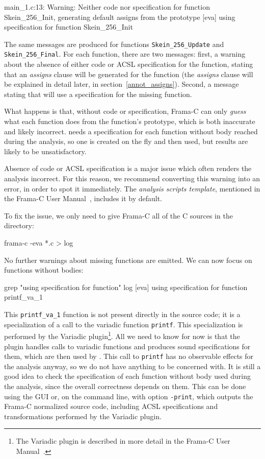 \documentclass{frama-c-book}
\begin{document}
\begin{logs}
 main_1.c:13: Warning:
  Neither code nor specification for function Skein_256_Init,
  generating default assigns from the prototype
[eva] using specification for function Skein_256_Init
\end{logs}

The same messages are produced for functions \verb|Skein_256_Update| and
\verb|Skein_256_Final|.
For each function, there are two messages: first, a warning about the absence
of either code or ACSL specification for the function, stating
that an {\em assigns} clause will be generated for the function
(the {\em assigns} clause will be explained in detail later, in
section~\ref{annot_assigns}). Second, a message stating that \Eva{} will use a
specification for the missing function.

What happens is that, without code or specification, Frama-C can only
{\em guess} what each function does from the function's prototype,
which is both inaccurate and likely incorrect. \Eva{} needs a specification
for each function without body reached during the analysis, so one is created
on the fly and then used, but results are likely to be unsatisfactory.

\begin{important}
  Absence of code or ACSL specification is a major issue which often renders
  the analysis incorrect. For this reason, we recommend converting this warning
  into an error, in order to spot it immediately.
  The {\em analysis scripts template}, mentioned in the Frama-C User
  Manual~\cite{FCUserMan}, includes it by default.
\end{important}

To fix the issue, we only need to give Frama-C all of the C sources in
the directory:
\begin{frama-c-commands}
frama-c -eva *.c > log
\end{frama-c-commands}

No further warnings about missing functions are emitted. We can now focus on
functions without bodies:
\begin{shell}
grep "using specification for function" log
[eva] using specification for function printf_va_1
\end{shell}
This \verb|printf_va_1| function is not present directly in the source code;
it is a specialization of a call to the variadic function \verb|printf|. This
specialization is performed by the \textsf{Variadic} plugin\footnote{The
  \textsf{Variadic} plugin is described in more detail in the Frama-C User
  Manual~\cite{FCUserMan}.}.
All we need to know for now is that the plugin handles calls to variadic functions
and produces sound specifications for them, which are then used by \Eva{}.
This call to \verb|printf| has no observable effects for the analysis anyway,
so we do not have anything to be concerned with. It is still a good idea to
check the specification of each function without body used during the analysis,
since the overall correctness depends on them. This can be done using the
GUI or, on the command line, with option \verb|-print|, which outputs the
Frama-C normalized source code, including ACSL specifications and
transformations performed by the \textsf{Variadic} plugin.
\end{document}
